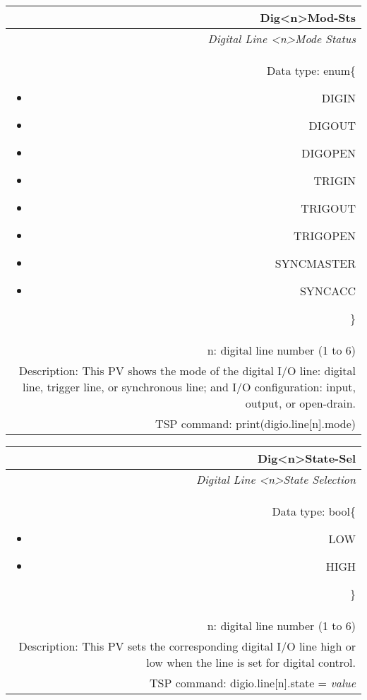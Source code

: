 \documentclass[openany]{article}
\begin{document}
		\begin{tabular}{N}
			\hline
			\bfseries Dig{\textless n\textgreater}Mod-Sts\label{pv:digmod-sts} \\ \hline
			\emph{Digital Line \textless n\textgreater Mode Status} \\
			Data type: enum\{\begin{itemize}[noitemsep]
				\small
				\item[] DIGIN
				\item[] DIGOUT
				\item[] DIGOPEN
				\item[] TRIGIN
				\item[] TRIGOUT
				\item[] TRIGOPEN
				\item[] SYNCMASTER
				\item[] SYNCACC
			\end{itemize}\} \\
			n: digital line number (1 to 6) \\
			Description: This PV shows the mode of the digital I/O line: digital line, trigger line, or synchronous line; and I/O configuration: input, output, or open-drain. \\
			TSP command: print(digio.line[n].mode)
		\end{tabular}

		\begin{tabular}{N}
			\hline
			\bfseries Dig{\textless n\textgreater}State-Sel\label{pv:digstate-sel} \\ \hline
			\emph{Digital Line \textless n\textgreater State Selection} \\
			Data type: bool\{\begin{itemize}[noitemsep]
				\small
				\item[] LOW
				\item[] HIGH
			\end{itemize}\} \\
			n: digital line number (1 to 6) \\
			Description: This PV sets the corresponding digital I/O line high or low when the line is set for digital control. \\
			TSP command: digio.line[n].state = \emph{value}
		\end{tabular}
\end{document}
